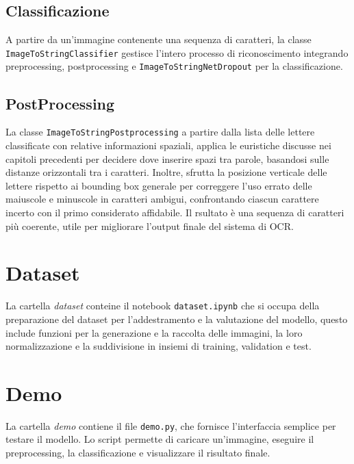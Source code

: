 \subsection{Classificazione}
A partire da un'immagine contenente una sequenza di caratteri, la classe \texttt{ImageToStringClassifier} gestisce l'intero processo di riconoscimento integrando preprocessing, postprocessing e \texttt{ImageToStringNetDropout} per la classificazione.

\subsection{PostProcessing}
La classe \texttt{ImageToStringPostprocessing} a partire dalla lista delle lettere classificate con relative informazioni spaziali, applica le euristiche discusse nei capitoli precedenti per decidere dove inserire spazi tra parole, basandosi sulle distanze orizzontali tra i caratteri. Inoltre, sfrutta la posizione verticale delle lettere rispetto ai bounding box generale per correggere l'uso errato delle maiuscole e minuscole in caratteri ambigui, confrontando ciascun carattere incerto con il primo considerato affidabile. Il rsultato è una sequenza di caratteri più coerente, utile per migliorare l'output finale del sistema di OCR.

\section{Dataset}
La cartella \emph{dataset} conteine il notebook \texttt{dataset.ipynb} che si occupa della preparazione del dataset per l’addestramento e la valutazione del modello, questo include funzioni per la generazione e la raccolta delle immagini, la loro normalizzazione e la suddivisione in insiemi di training, validation e test.
\section{Demo}
La cartella \emph{demo} contiene il file \texttt{demo.py}, che fornisce l'interfaccia semplice per testare il modello. Lo script permette di caricare un'immagine, eseguire il preprocessing, la classificazione e visualizzare il risultato finale.
